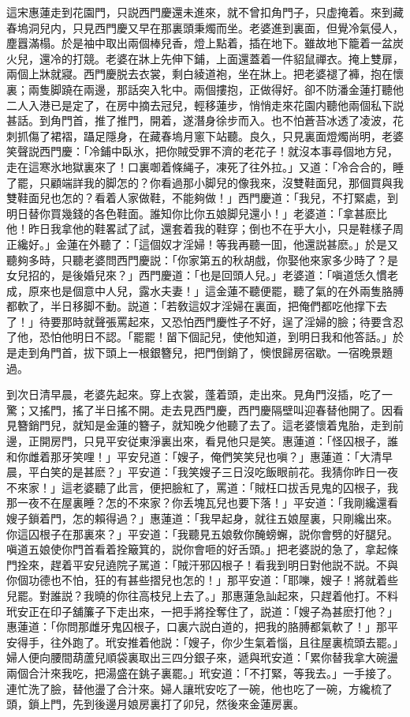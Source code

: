 這宋惠蓮走到花園門，只説西門慶還未進來，就不曾扣角門子，只虚掩着。來到藏春塢洞兒内，只見西門慶又早在那裏頭秉燭而坐。老婆進到裏面，但覺冷氣侵人，塵囂滿榻。於是袖中取出兩個棒兒香，燈上點着，插在地下。雖故地下籠着一盆炭火兒，還冷的打競。老婆在牀上先伸下鋪，上面還蓋着一件貂鼠禪衣。掩上雙扉，兩個上牀就寢。西門慶脱去衣裳，剩白綾道袍，坐在牀上。把老婆褪了褲，抱在懷裏；兩隻脚蹺在兩邊，那話突入牝中。兩個摟抱，正做得好。卻不防潘金蓮打聽他二人入港已是定了，在房中摘去冠兒，輕移蓮步，悄悄走來花園内聽他兩個私下説甚話。到角門首，推了推門，開着，遂潛身徐步而入。也不怕蒼苔冰透了凌波，花刺抓傷了裙褶，躡足隱身，在藏春塢月窻下站聽。良久，只見裏面燈燭尚明，老婆笑聲説西門慶：「冷鋪中臥氷，把你賊受罪不濟的老花子！就沒本事尋個地方兒，走在這寒氷地獄裏來了！口裏啣着條䋲子，凍死了往外拉。」又道：「冷合合的，睡了罷，只顧端詳我的脚怎的？你看過那小脚兒的像我來，沒雙鞋面兒，那個買與我雙鞋面兒也怎的？看着人家做鞋，不能夠做！」西門慶道：「我兒，不打緊處，到明日替你買幾錢的各色鞋面。誰知你比你五娘脚兒還小！」老婆道：「拿甚麽比他！昨日我拿他的鞋畧試了試，還套着我的鞋穿；倒也不在乎大小，只是鞋樣子周正纔好。」金蓮在外聽了：「這個奴才淫婦！等我再聽一囬，他還説甚麽。」於是又聽夠多時，只聽老婆問西門慶説：「你家第五的秋胡戲，你娶他來家多少時了？是女兒招的，是後婚兒來？」西門慶道：「也是回頭人兒。」老婆道：「嗔道恁久慣老成，原來也是個意中人兒，露水夫妻！」這金蓮不聽便罷，聽了氣的在外兩隻胳膊都軟了，半日移脚不動。説道：「若敎這奴才淫婦在裏面，把俺們都吃他撑下去了！」待要那時就聲張罵起來，又恐怕西門慶性子不好，逞了淫婦的臉；待要含忍了他，恐怕他明日不認。「罷罷！㽞下個記兒，使他知道，到明日我和他答話。」於是走到角門首，拔下頭上一根銀簪兒，把門倒銷了，懊恨歸房宿歇。一宿晚景題過。

到次日清早晨，老婆先起來。穿上衣裳，蓬着頭，走出來。見角門沒插，吃了一驚；又搖門，搖了半日搖不開。走去見西門慶，西門慶隔壁叫迎春替他開了。因看見簪銷門兒，就知是金蓮的簪子，就知晚夕他聽了去了。這老婆懷着鬼胎，走到前邊，正開房門，只見平安従東淨裏出來，看見他只是笑。惠蓮道：「怪囚根子，誰和你雌着那牙笑哩！」平安兒道：「嫂子，俺們笑笑兒也嗔？」惠蓮道：「大清早晨，平白笑的是甚麽？」平安道：「我笑嫂子三日沒吃飯眼前花。我猜你昨日一夜不來家！」這老婆聽了此言，便把臉紅了，罵道：「賊枉口拔舌見鬼的囚根子，我那一夜不在屋裏睡？怎的不來家？你丢塊瓦兒也要下落！」平安道：「我剛纔還看嫂子鎖着門，怎的賴得過？」惠蓮道：「我早起身，就往五娘屋裏，只剛纔出來。你這囚根子在那裏來？」平安道：「我聽見五娘敎你醃螃蠏，説你會劈的好腿兒。嗔道五娘使你門首看着拴簸箕的，説你會咂的好舌頭。」把老婆説的急了，拿起條門拴來，趕着平安兒遶院子駡道：「賊汗邪囚根子！看我到明日對他説不説。不與你個功德也不怕，狂的有甚些摺兒也怎的！」那平安道：「耶嚛，嫂子！將就着些兒罷。對誰説？我曉的你往高枝兒上去了。」那惠蓮急訕起來，只趕着他打。不料玳安正在印子舖簾子下走出來，一把手將拴奪住了，説道：「嫂子為甚麽打他？」惠蓮道：「你問那雌牙鬼囚根子，口裏六説白道的，把我的胳膊都氣軟了！」那平安得手，往外跑了。玳安推着他説：「嫂子，你少生氣着惱，且往屋裏梳頭去罷。」婦人便向腰間葫蘆兒順袋裏取出三四分銀子來，遞與玳安道：「累你替我拿大碗盪兩個合汁來我吃，把湯盛在銚子裏罷。」玳安道：「不打緊，等我去。」一手接了。連忙洗了臉，替他盪了合汁來。婦人讓玳安吃了一碗，他也吃了一碗，方纔梳了頭，鎖上門，先到後邊月娘房裏打了卯兒，然後來金蓮房裏。


